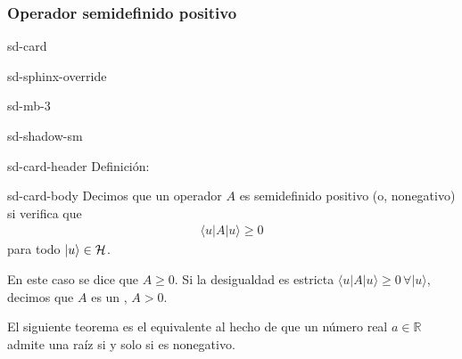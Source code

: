 \documentclass[letterpaper,10pt,english]{jupyterBook}
\newcommand{\bra}[1]{\langle #1|}
\newcommand{\ket}[1]{|#1\rangle}
\newcommand{\Hil}{{\cal H}}
\begin{document}
\subsubsection{Operador semi\sphinxhyphen{}definido positivo}
\label{\detokenize{docs/Part_01_Formalismo/Chapter_01_02_Formalismo_matem_xe1tico/01_03_Operadores_myst:operador-semi-definido-positivo}}
\begin{sphinxuseclass}{sd-card}
\begin{sphinxuseclass}{sd-sphinx-override}
\begin{sphinxuseclass}{sd-mb-3}
\begin{sphinxuseclass}{sd-shadow-sm}
\begin{sphinxuseclass}{sd-card-header}
\sphinxAtStartPar
Definición:

\end{sphinxuseclass}
\begin{sphinxuseclass}{sd-card-body}
\sphinxAtStartPar
Decimos que un operador  \(A\) es semi\sphinxhyphen{}definido positivo  (o, no\sphinxhyphen{}negativo)  si  verifica que
\begin{equation*}
\begin{split}
\bra{u} A\ket{u} \geq 0 
\end{split}
\end{equation*}
\sphinxAtStartPar
para todo \(\ket{u}\in \Hil\).

\end{sphinxuseclass}
\end{sphinxuseclass}
\end{sphinxuseclass}
\end{sphinxuseclass}
\end{sphinxuseclass}
\sphinxAtStartPar
En este caso se dice que \(A\geq 0\). Si la desigualdad es estricta \(\bra{u} A\ket{u} \geq 0 \, \forall \ket{u}\), decimos que \(A\) es un , \(A>0\).

\sphinxAtStartPar
El siguiente teorema es el equivalente al hecho de que un número real \(a\in {\mathbb R}\) admite una raíz si y solo si es no\sphinxhyphen{}negativo.
\end{document}
